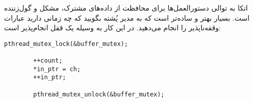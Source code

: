 اتکا به توالی دستورالعمل‌ها برای محافظت از داده‌های مشترک، مشکل و گول‌زننده است. بسیار بهتر و ساده‌تر است که به مدیر پُشته بگویید که چه زمانی دارید عبارات وقفه‌ناپذیر را انجام می‌دهید. در  این کار به وسیله یک قفل  انجام‌پذیر است:
\begin{LTR}
    \begin{lstlisting}[style=C++Style]
        pthread_mutex_lock(&buffer_mutex);

        ++count;
        *in_ptr = ch;
        ++in_ptr;

        pthread_mutex_unlock(&buffer_mutex);
    \end{lstlisting}
\end{LTR}
